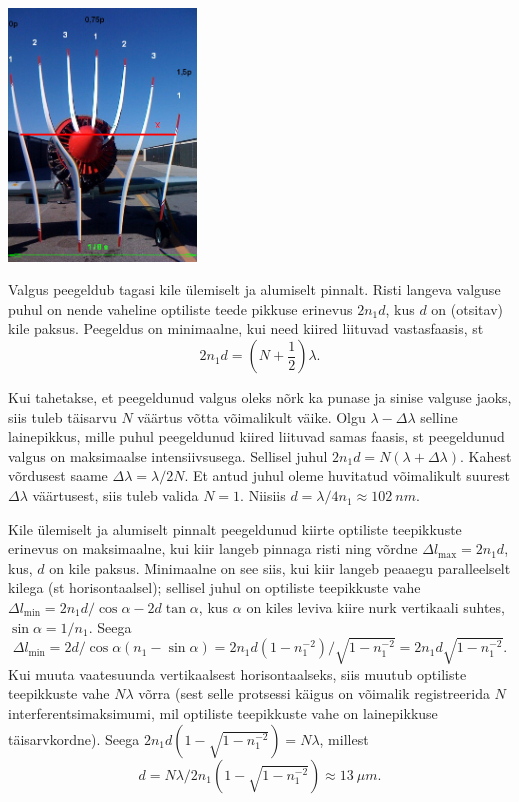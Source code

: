 \documentclass[10pt, twoside]{article}
\begin{document}
{\begin{center}
	\includegraphics[width=50mm]{2010-v3g-10-Propeller3.jpg}
\end{center}
\probend
\bigskip


\solu
Valgus peegeldub tagasi kile ülemiselt ja alumiselt pinnalt. Risti langeva valguse puhul on nende vaheline optiliste teede pikkuse erinevus $2n_1d$, kus $d$ on (otsitav) kile paksus. Peegeldus on minimaalne, kui need kiired liituvad vastasfaasis, st
\[
2n_1d = \left( N + \frac 12 \right)\lambda.
\]

Kui tahetakse, et peegeldunud valgus oleks nõrk ka punase ja sinise valguse jaoks, siis tuleb täisarvu $N$ väärtus võtta võimalikult väike. Olgu $\lambda - \Delta \lambda $ selline lainepikkus, mille puhul peegeldunud kiired liituvad samas faasis, st peegeldunud valgus on maksimaalse intensiivsusega. Sellisel juhul $2n_1d = N(\lambda + \Delta \lambda )$. Kahest võrdusest saame $\Delta \lambda = \lambda /2N$. Et antud juhul oleme huvitatud võimalikult suurest $\Delta \lambda$ väärtusest, siis tuleb valida $N = 1$. Niisiis $d = \lambda /4n_1 \approx \SI{102}{nm}$.
\probend
\bigskip


\solu
Kile ülemiselt ja alumiselt pinnalt peegeldunud kiirte optiliste teepikkuste erinevus on maksimaalne, kui
kiir langeb pinnaga risti ning võrdne $\Delta l_{\max}=2n_1d$, kus, $d$ on kile paksus. Minimaalne on see siis, kui kiir langeb peaaegu paralleelselt kilega (st horisontaalsel); sellisel juhul on optiliste teepikkuste vahe $\Delta l_{\min}=2n_1d/\cos\alpha-2d\tan\alpha$, kus $\alpha$ on kiles leviva kiire nurk vertikaali suhtes, $\sin\alpha=1/n_1$. Seega 
\[
\Delta l_{\min}=2d/\cos\alpha(n_1-\sin\alpha)=2n_1d(1-n_1^{-2})/\sqrt{1-n_1^{-2}}=2n_1d\sqrt{1-n_1^{-2}}.
\]
Kui muuta vaatesuunda vertikaalsest horisontaalseks, siis muutub optiliste teepikkuste vahe $N\lambda$ võrra (sest selle protsessi käigus on võimalik registreerida $N$ interferentsimaksimumi, mil optiliste teepikkuste vahe on lainepikkuse täisarvkordne). Seega
$2n_1d(1-\sqrt{1-n_1^{-2}})=N\lambda$, millest $$d=N\lambda/2n_1(1-\sqrt{1-n_1^{-2}})\approx \SI{13}{\mu m}.$$
\probend
\bigskip

}
\end{document}
